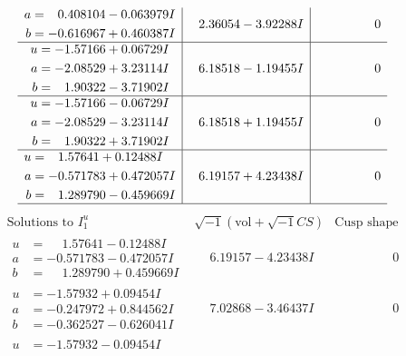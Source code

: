 \documentclass[1p]{elsarticle_modified}
\theoremstyle{definition}
\newcommand{\I}{\sqrt{-1}}
\begin{document}
$$\begin{array}{c|c|c}
\begin{aligned}
a &= \phantom{-}0.408104 - 0.063979 I \\
b &= -0.616967 + 0.460387 I\end{aligned}
 & \phantom{-}2.36054 - 3.92288 I & \phantom{-0.000000 } 0 \\ \hline\begin{aligned}
u &= -1.57166 + 0.06729 I \\
a &= -2.08529 + 3.23114 I \\
b &= \phantom{-}1.90322 - 3.71902 I\end{aligned}
 & \phantom{-}6.18518 - 1.19455 I & \phantom{-0.000000 } 0 \\ \hline\begin{aligned}
u &= -1.57166 - 0.06729 I \\
a &= -2.08529 - 3.23114 I \\
b &= \phantom{-}1.90322 + 3.71902 I\end{aligned}
 & \phantom{-}6.18518 + 1.19455 I & \phantom{-0.000000 } 0 \\ \hline\begin{aligned}
u &= \phantom{-}1.57641 + 0.12488 I \\
a &= -0.571783 + 0.472057 I \\
b &= \phantom{-}1.289790 - 0.459669 I\end{aligned}
 & \phantom{-}6.19157 + 4.23438 I & \phantom{-0.000000 } 0\\
 \hline 
 \end{array}$$\newpage$$\begin{array}{c|c|c}  
\text{Solutions to }I^u_{1}& \I (\text{vol} + \sqrt{-1}CS) & \text{Cusp shape}\\
 \hline 
\begin{aligned}
u &= \phantom{-}1.57641 - 0.12488 I \\
a &= -0.571783 - 0.472057 I \\
b &= \phantom{-}1.289790 + 0.459669 I\end{aligned}
 & \phantom{-}6.19157 - 4.23438 I & \phantom{-0.000000 } 0 \\ \hline\begin{aligned}
u &= -1.57932 + 0.09454 I \\
a &= -0.247972 + 0.844562 I \\
b &= -0.362527 - 0.626041 I\end{aligned}
 & \phantom{-}7.02868 - 3.46437 I & \phantom{-0.000000 } 0 \\ \hline\begin{aligned}
u &= -1.57932 - 0.09454 I \\

\end{aligned}
\end{array}$$
\end{document}
